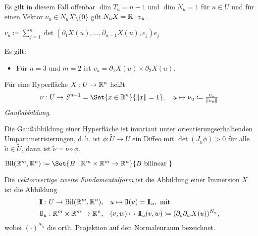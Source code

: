 \documentclass{cheat-sheet}
\newcommand{\Bil}{\mathrm{Bil}}
\newcommand{\II}{\mathrm{I\!I}}
\begin{document}
\begin{bem}
  Es gilt in diesem Fall offenbar $\dim T_u = n - 1$ und $\dim N_u = 1$ für $u \in U$ und für einen Vektor $\nu_u \in N_u X \setminus \{ 0 \}$ gilt $N_u X = \mathbb{R} \cdot v_u$.
\end{bem}

\begin{defn}
  $v_u \coloneqq \sum_{j=1}^{n} \det(\partial_1 X(u), ..., \partial_{n-1} X(u), e_j) e_j$
\end{defn}

\begin{bem}
  Es gilt:
  \begin{itemize}
    \item Für $n = 3$ und $m = 2$ ist $v_u = \partial_1 X(u) \times \partial_2 X(u)$.
  \end{itemize}
\end{bem}

\begin{defn}
  Für eine Hyperfläche $X : U \to \mathbb{R}^n$ heißt
  \[ \nu : U \to S^{n-1} = \Set{ x \in \R^n }{ \| x \| = 1 }, \quad u \mapsto \nu_u \coloneqq \tfrac{v_u}{\| v_u \|} \]
  \emph{Gaußabbildung}.
\end{defn}

\begin{satz}
  Die Gaußabbildung einer Hyperfläche ist invariant unter orientierungserhaltenden Umparametrisierungen, d.\,h. ist $\phi : \tilde{U} \to U$ ein Diffeo mit $\det(J_{\tilde{u}} \phi) > 0$ für alle $\tilde{u} \in \tilde{U}$, dann ist $\tilde{\nu} = \nu \circ \phi$.
\end{satz}

\begin{nota}
  $\Bil(\R^m, \R^n) \coloneqq \Set{ B : \R^m \times \R^m \to \R^n }{ B \text{ bilinear } }$
\end{nota}

\begin{defn}
  Die \emph{vektorwertige zweite Fundamentalform} ist die Abbildung einer Immersion $X$ ist die Abbildung
  \begin{align*}
    \II : U \to \Bil(\R^m, \R^n), \quad & u \mapsto \II(u) = \II_u, \text { mit } \\
    \II_u : \R^m \times \R^m \to \R^n, \quad & (v, w) \mapsto \II_u(v, w) \coloneqq (\partial_v \partial_w X(u))^{N_u},
  \end{align*}
  wobei $(\cdot)^{N_u}$ die orth. Projektion auf den Normalenraum bezeichnet.
\end{defn}
\end{document}
